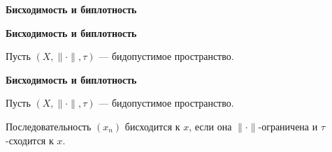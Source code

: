 \documentclass[11pt]{article}
\begin{document}
\newpage

\begin{center}
{\color{notaeYELLOW}\bfseries\fontsize{44}{52}\selectfont Бисходимость и биплотность}
\end{center}
\vspace*{\fill}
\begin{center}
\fontsize{36}{43}\selectfont
\end{center}
\vspace*{\fill}

\newpage

\begin{center}
{\color{notaeYELLOW}\bfseries\fontsize{44}{52}\selectfont Бисходимость и биплотность}
\end{center}
\vspace*{\fill}
\begin{center}
\fontsize{36}{43}\selectfont
\parbox{\linewidth}{\centering\noindent Пусть $(X,\|\cdot\|,\tau)$ --- бидопустимое пространство.
\par}\vspace{0.4in}
\end{center}
\vspace*{\fill}

\newpage

\begin{center}
{\color{notaeYELLOW}\bfseries\fontsize{44}{52}\selectfont Бисходимость и биплотность}
\end{center}
\vspace*{\fill}
\begin{center}
\fontsize{36}{43}\selectfont
\parbox{\linewidth}{\centering\noindent Пусть $(X,\|\cdot\|,\tau)$ --- бидопустимое пространство.
\par}\vspace{0.4in}
\parbox{\linewidth}{\centering\noindent Последовательность $(x_n)$ бисходится к $x$, если она $\|\cdot\|$-ограничена и $\tau$-сходится к $x$.
\par}\vspace{0.4in}
\end{center}
\vspace*{\fill}

\newpage
\end{document}

